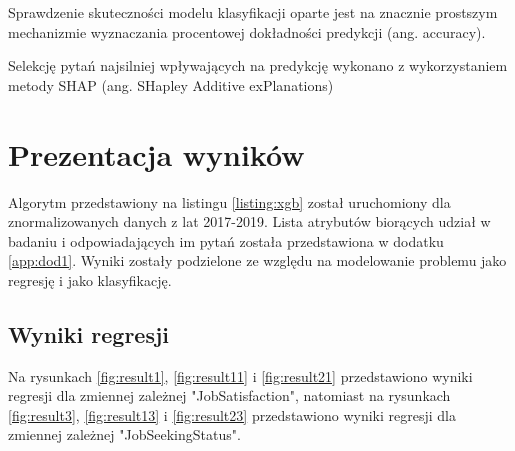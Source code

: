 Sprawdzenie skuteczności modelu klasyfikacji oparte jest na znacznie prostszym mechanizmie wyznaczania procentowej dokładności predykcji (ang. accuracy).

Selekcję pytań najsilniej wpływających na predykcję wykonano z wykorzystaniem metody SHAP (ang. SHapley Additive exPlanations)


\section{Prezentacja wyników}\label{sec:analysis:important-features}

Algorytm przedstawiony na listingu \ref{listing:xgb} został uruchomiony dla znormalizowanych danych z lat 2017-2019.
Lista atrybutów biorących udział w badaniu i odpowiadających im pytań została przedstawiona w dodatku \ref{app:dod1}.
Wyniki zostały podzielone ze względu na modelowanie problemu jako regresję i jako klasyfikację.

\subsection{Wyniki regresji}\label{sec:analysis:important-features:regression}

Na rysunkach \ref{fig:result1}, \ref{fig:result11} i \ref{fig:result21} przedstawiono wyniki regresji dla zmiennej zależnej "JobSatisfaction", natomiast na rysunkach \ref{fig:result3}, \ref{fig:result13} i \ref{fig:result23} przedstawiono wyniki regresji dla zmiennej zależnej "JobSeekingStatus".




